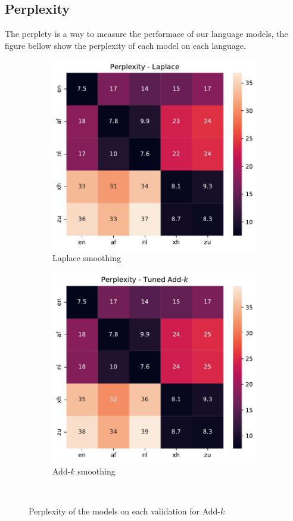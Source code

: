 \subsection{Perplexity}
The perplety is a way to measure the performace of our language models, the figure bellow show the perplexity of each model on each language.
\begin{figure}[H]
    \centering
    \begin{subfigure}[t]{0.5\linewidth}
        \centering
        \includegraphics[width=\linewidth]{./figures/laplace.pdf}
        \caption{Laplace smoothing}
    \end{subfigure}%
    \begin{subfigure}[t]{0.5\linewidth}
        \centering
        \includegraphics[width=\linewidth]{./figures/add_k.pdf}
        \caption{Add-$k$ smoothing}
    \end{subfigure}\\
    \caption{Perplexity of the models on each validation for Add-$k$}
    \label{fig:add-k}
\end{figure}
